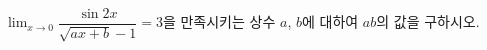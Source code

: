 $\displaystyle\lim_{x\to 0}\dfrac{\sin 2x}{\sqrt{ax+b}-1}=3$을 만족시키는 상수 $a$, $b$에 대하여 $ab$의 값을 구하시오.
